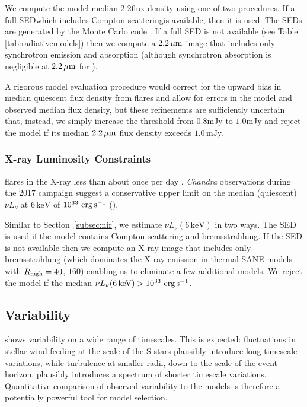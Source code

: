 We compute the model median 2.2\um flux density using one of two procedures.  If a full SED\textemdash which includes Compton scattering\textemdash is available, then it is used. The SEDs are generated by the \grmonty Monte Carlo code \citep{2009ApJS..184..387D, Wong_2022}. If a full SED is not available (see Table \ref{tab:radiativemodels}) then we compute a $2.2\,\mu\mathrm{m}$ image that includes only synchrotron emission and absorption (although synchrotron absorption is negligible at $2.2\,\mu\mathrm{m}$ for \sgra).

A rigorous model evaluation procedure would correct for the upward bias in median quiescent flux density from flares and allow for errors in the model and observed median flux density, but these refinements are sufficiently uncertain that, instead, we simply increase the threshold from $0.8$mJy to $1.0$mJy and reject the model if its
median $2.2\,\mu\mathrm{m}$ flux density exceeds $1.0\,\mathrm{mJy}$.

\subsubsection{X-ray Luminosity Constraints}

\sgra flares in the X-ray less than about once per day \citep[see][and references therein]{2018MNRAS.473..306Y}.
\emph{Chandra} observations during the 2017 campaign suggest a conservative upper limit on the median (quiescent) $\nu L_\nu$ at $6\,\mathrm{keV}$ of $10^{33}\,\,\mathrm{erg}\,\mathrm{s}^{-1}$ ().

Similar to Section~\ref{subsec:nir}, we estimate $\nu L_\nu(6\,\mathrm{keV})$ in two ways.  The SED is used if the model contains Compton scattering and bremsstrahlung.  If the SED is not available then we compute an X-ray image that includes only bremsstrahlung (which dominates the X-ray emission in thermal SANE models with $R_\mathrm{high} = 40$, $160$) enabling us to eliminate a few additional models.  We reject the model if the median $\nu L_\nu(6\,\mathrm{keV}) > 10^{33}\,\,\mathrm{erg}\,\mathrm{s}^{-1}$.


\subsection{Variability}

\sgra shows variability on a wide range of timescales.  This is expected: fluctuations in stellar wind feeding at the scale of the S-stars plausibly introduce long timescale variations, while turbulence at smaller radii, down to the scale of the event horizon, plausibly introduces a spectrum of shorter timescale variations.  Quantitative comparison of observed variability to the models is therefore a potentially powerful tool for model selection.

